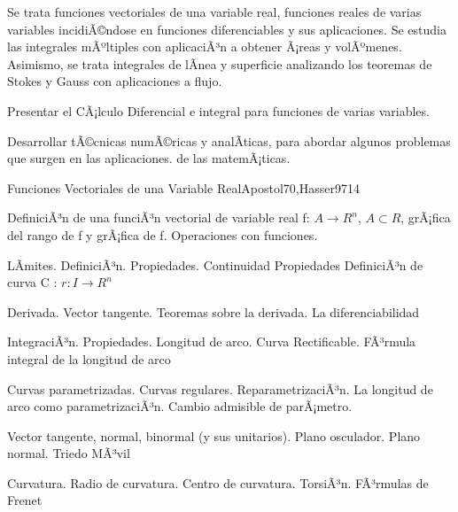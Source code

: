 \begin{syllabus}


\begin{justification}
Se trata funciones vectoriales de una variable real, funciones reales de varias variables incidiÃ©ndose en funciones diferenciables y sus aplicaciones. Se estudia las integrales mÃºltiples con aplicaciÃ³n a obtener Ã¡reas y volÃºmenes.
Asimismo, se trata integrales de lÃ­nea y superficie analizando los teoremas de Stokes y Gauss con aplicaciones a flujo.
\end{justification}

\begin{goals}
\item  Presentar el CÃ¡lculo Diferencial e integral para funciones de varias variables.
\item  Desarrollar tÃ©cnicas numÃ©ricas y analÃ­ticas, para abordar algunos problemas que surgen en las aplicaciones. de las matemÃ¡ticas.
\end{goals}

\begin{outcomes}
\end{outcomes}

\begin{unit}{Funciones Vectoriales de una Variable Real}{Apostol70,Hasser97}{14}
   \begin{topics}
	\item  DefiniciÃ³n de una funciÃ³n vectorial de variable real f: $A \rightarrow R^n$, $A \subset R$, grÃ¡fica del rango de f y grÃ¡fica de f. Operaciones con funciones.
	\item LÃ­mites. DefiniciÃ³n. Propiedades. Continuidad  Propiedades DefiniciÃ³n de curva C : $r : I \rightarrow R^n$
	\item  Derivada. Vector tangente. Teoremas sobre la derivada. La diferenciabilidad
	\item  IntegraciÃ³n. Propiedades. Longitud de arco. Curva Rectificable. FÃ³rmula integral de la longitud de arco
	\item  Curvas parametrizadas. Curvas regulares. ReparametrizaciÃ³n. La longitud de arco como parametrizaciÃ³n. Cambio admisible de parÃ¡metro.
	\item  Vector tangente, normal, binormal (y sus unitarios). Plano osculador. Plano normal. Triedo MÃ³vil
	\item Curvatura. Radio de curvatura.  Centro de curvatura. TorsiÃ³n. FÃ³rmulas de Frenet
   \end{topics}


\end{unit}
\end{syllabus}
